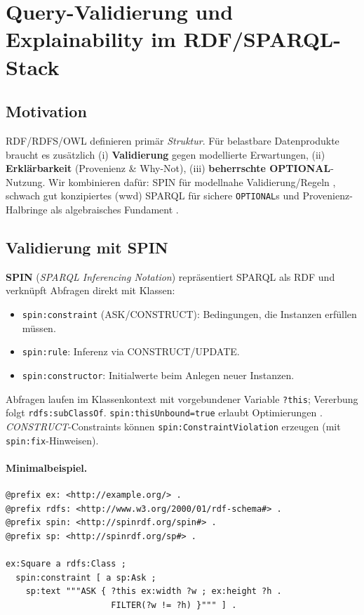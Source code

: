 \section{Query-Validierung und Explainability im RDF/SPARQL-Stack}
\label{chap:Query-validation-explainability}

\subsection{Motivation}
RDF/RDFS/OWL definieren primär \emph{Struktur}. Für belastbare Datenprodukte braucht es zusätzlich (i) \textbf{Validierung} gegen modellierte Erwartungen, (ii) \textbf{Erklärbarkeit} (Provenienz \& Why-Not), (iii) \textbf{beherrschte OPTIONAL}-Nutzung. Wir kombinieren dafür: SPIN für modellnahe Validierung/Regeln \cite{spin-w3c}, schwach gut konzipiertes (wwd) SPARQL für sichere \texttt{OPTIONAL}s \cite{kaminski-kostylev-beyond-well-designed} und Provenienz-Halbringe als algebraisches Fundament \cite{green-provenance-semirings,herschel-why-why-not,herschel-survey}.

\subsection{Validierung mit SPIN}
\textbf{SPIN} (\emph{SPARQL Inferencing Notation}) repräsentiert SPARQL als RDF und verknüpft Abfragen direkt mit Klassen:
\begin{itemize}
  \item \texttt{spin:constraint} (ASK/CONSTRUCT): Bedingungen, die Instanzen erfüllen müssen.
  \item \texttt{spin:rule}: Inferenz via CONSTRUCT/UPDATE.
  \item \texttt{spin:constructor}: Initialwerte beim Anlegen neuer Instanzen.
\end{itemize}
Abfragen laufen im Klassenkontext mit vorgebundener Variable \texttt{?this}; Vererbung folgt \texttt{rdfs:subClassOf}. \texttt{spin:thisUnbound=true} erlaubt Optimierungen \cite{spin-w3c}. \emph{CONSTRUCT}-Constraints können \texttt{spin:ConstraintViolation} erzeugen (mit \texttt{spin:fix}-Hinweisen).

\paragraph{Minimalbeispiel.}
\begin{lstlisting}[language=turtle,basicstyle=\ttfamily\small]
@prefix ex: <http://example.org/> .
@prefix rdfs: <http://www.w3.org/2000/01/rdf-schema#> .
@prefix spin: <http://spinrdf.org/spin#> .
@prefix sp: <http://spinrdf.org/sp#> .

ex:Square a rdfs:Class ;
  spin:constraint [ a sp:Ask ;
    sp:text """ASK { ?this ex:width ?w ; ex:height ?h .
                     FILTER(?w != ?h) }""" ] .
\end{lstlisting}

